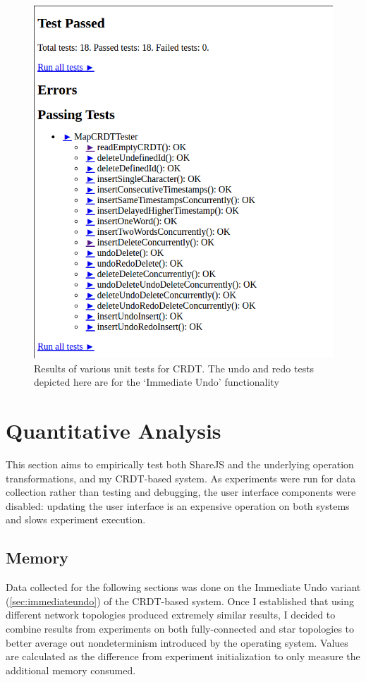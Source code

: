 \documentclass[12pt,a4paper,twoside,openright]{report}
\begin{document}
	\begin{figure}[htb]
	\centering
	\includegraphics[width=0.56\linewidth]{figs/unittests.png}
	\caption[Unit tests for CRDT]{Results of various unit tests for CRDT. The undo and redo tests depicted here are for the `Immediate Undo' functionality}
	\label{fig:unittests}
	\end{figure}
	
	
	
	
	\section{Quantitative Analysis}
	
		This section aims to empirically test both ShareJS and the underlying operation transformations, and my CRDT-based system. As experiments were run for data collection rather than testing and debugging, the user interface components were disabled: updating the user interface is an expensive operation on both systems and slows experiment execution.
		
		
			
		\subsection{Memory}
			Data collected for the following sections was done on the Immediate Undo variant (\cref{sec:immediateundo}) of the CRDT-based system. Once I established that using different network topologies produced extremely similar results, I decided to combine results from experiments on both fully-connected and star topologies to better average out nondeterminism introduced by the operating system. Values are calculated as the difference from experiment initialization to only measure the additional memory consumed.
		
\end{document}
